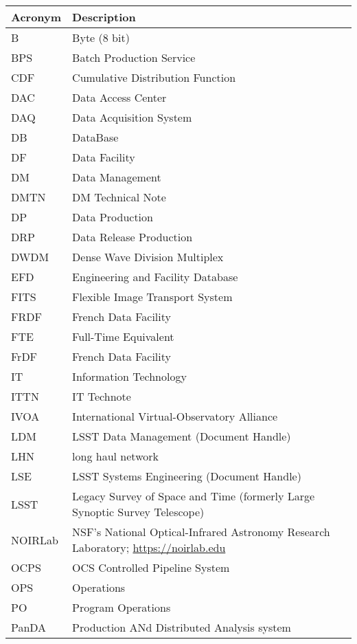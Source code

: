 \addtocounter{table}{-1}
\begin{longtable}{p{}p{}}\hline
\textbf{Acronym} & \textbf{Description}  \\\hline

B & Byte (8 bit) \\\hline
BPS & Batch Production Service \\\hline
CDF & Cumulative Distribution Function \\\hline
DAC & Data Access Center \\\hline
DAQ & Data Acquisition System \\\hline
DB & DataBase \\\hline
DF & Data Facility \\\hline
DM & Data Management \\\hline
DMTN & DM Technical Note \\\hline
DP & Data Production \\\hline
DRP & Data Release Production \\\hline
DWDM & Dense Wave Division Multiplex \\\hline
EFD & Engineering and Facility Database \\\hline
FITS & Flexible Image Transport System \\\hline
FRDF & French Data Facility \\\hline
FTE & Full-Time Equivalent \\\hline
FrDF & French Data Facility \\\hline
IT & Information Technology \\\hline
ITTN & IT Technote \\\hline
IVOA & International Virtual-Observatory Alliance \\\hline
LDM & LSST Data Management (Document Handle) \\\hline
LHN & long haul network \\\hline
LSE & LSST Systems Engineering (Document Handle) \\\hline
LSST & Legacy Survey of Space and Time (formerly Large Synoptic Survey Telescope) \\\hline
NOIRLab & NSF's National Optical-Infrared Astronomy Research Laboratory; \url{https://noirlab.edu} \\\hline
OCPS & OCS Controlled Pipeline System \\\hline
OPS & Operations \\\hline
PO & Program Operations \\\hline
PanDA &  Production ANd Distributed Analysis system \\\hline

\end{longtable}
